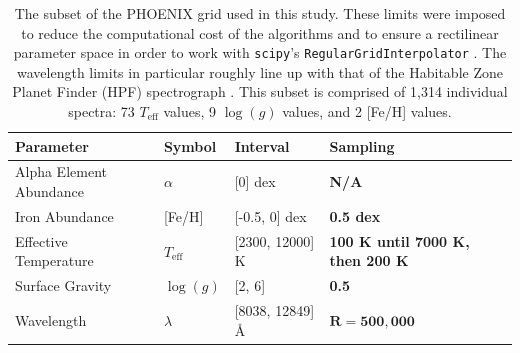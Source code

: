 \documentclass[twocolumn, linenumbers]{aastex631}
\begin{document}
\begin{table}
    \hspace*{0.6cm}\begin{tabular}{llll}
        \hline
        \bf{Parameter} & \bf{Symbol} & \bf{Interval} & \bf{Sampling}\\
        \hline
        Alpha Element Abundance & $\alpha$ & [0] dex & \bf{N/A}\\
        Iron Abundance & [Fe/H] & [-0.5, 0] dex & \bf{0.5 dex}\\
        Effective Temperature & $T_{\mathrm{eff}}$ & [2300, 12000] K & \bf{100 K until 7000 K, then 200 K}\\
        Surface Gravity & $\log(g)$ & [2, 6] & \bf{0.5} \\
        Wavelength & $\lambda$ & [8038, 12849] \AA & $\mathbf{R = 500,000}$\\
        \hline
    \end{tabular}
    \caption{The subset of the PHOENIX grid used in this study.
    These limits were imposed to reduce the computational cost of the algorithms and to ensure a rectilinear parameter space in order to work with \texttt{scipy}'s \texttt{RegularGridInterpolator} \citep{scipy}.
    The wavelength limits in particular roughly line up with that of the Habitable Zone Planet Finder (HPF) spectrograph \citep{HPF}.
    This subset is comprised of 1,314 individual spectra: 73 $T_{\mathrm{eff}}$ values, 9 $\log(g)$ values, and 2 [Fe/H] values.}
    \label{tab:table1}
\end{table}
\end{document}
